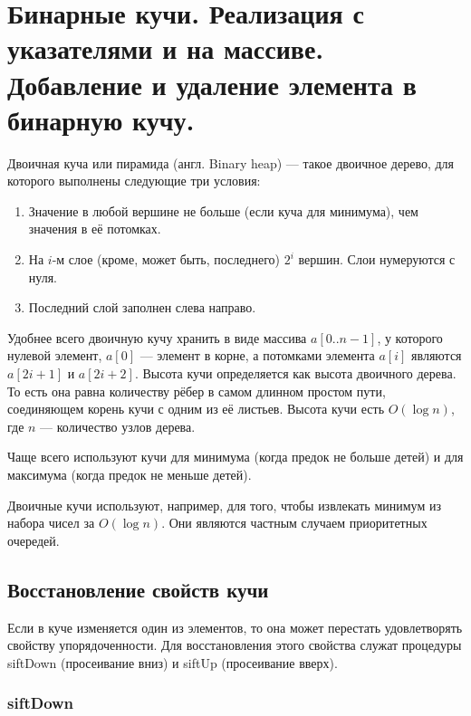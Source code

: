\section{Бинарные кучи. Реализация с указателями и на массиве. Добавление и удаление элемента в бинарную кучу. }

\begin{definition}
    Двоичная куча или пирамида (англ. Binary heap) --- такое двоичное дерево, для которого выполнены следующие три условия:

    \begin{enumerate}
        \item Значение в любой вершине не больше (если куча для минимума), чем значения в её потомках.
        \item На $i$-м слое (кроме, может быть, последнего) $2^i$ вершин. Слои нумеруются с нуля.
        \item Последний слой заполнен слева направо.
    \end{enumerate}
\end{definition}

Удобнее всего двоичную кучу хранить в виде массива $a[0..n-1]$, у которого нулевой элемент, $a[0]$ --- элемент в корне, а потомками элемента $a[i]$ являются $a[2i+1]$ и $a[2i+2]$.
Высота кучи определяется как высота двоичного дерева.
То есть она равна количеству рёбер в самом длинном простом пути, соединяющем корень кучи с одним из её листьев.
Высота кучи есть $O(\log n)$, где $n$ --- количество узлов дерева.

Чаще всего используют кучи для минимума (когда предок не больше детей) и для максимума (когда предок не меньше детей).

Двоичные кучи используют, например, для того, чтобы извлекать минимум из набора чисел за $O(\log n)$.
Они являются частным случаем приоритетных очередей.

\subsection{Восстановление свойств кучи}

Если в куче изменяется один из элементов, то она может перестать удовлетворять свойству упорядоченности.
Для восстановления этого свойства служат процедуры siftDown (просеивание вниз) и siftUp (просеивание вверх). 

\subsubsection{siftDown}

